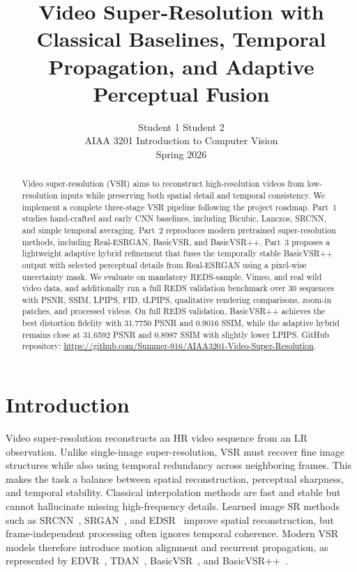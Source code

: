 \documentclass[10pt,twocolumn,letterpaper]{article}
\title{Video Super-Resolution with Classical Baselines, Temporal Propagation, and Adaptive Perceptual Fusion}
\author{
  Student 1 \quad Student 2\\
  AIAA 3201 Introduction to Computer Vision\\
  Spring 2026
}
\begin{document}
\maketitle

\begin{abstract}
Video super-resolution (VSR) aims to reconstruct high-resolution videos from low-resolution inputs while preserving both spatial detail and temporal consistency. We implement a complete three-stage VSR pipeline following the project roadmap. Part~1 studies hand-crafted and early CNN baselines, including Bicubic, Lanczos, SRCNN, and simple temporal averaging. Part~2 reproduces modern pretrained super-resolution methods, including Real-ESRGAN, BasicVSR, and BasicVSR++. Part~3 proposes a lightweight adaptive hybrid refinement that fuses the temporally stable BasicVSR++ output with selected perceptual details from Real-ESRGAN using a pixel-wise uncertainty mask. We evaluate on mandatory REDS-sample, Vimeo, and real wild video data, and additionally run a full REDS validation benchmark over 30 sequences with PSNR, SSIM, LPIPS, FID, tLPIPS, qualitative rendering comparisons, zoom-in patches, and processed videos. On full REDS validation, BasicVSR++ achieves the best distortion fidelity with 31.7750 PSNR and 0.9016 SSIM, while the adaptive hybrid remains close at 31.6592 PSNR and 0.8987 SSIM with slightly lower LPIPS. GitHub repository: \url{https://github.com/Summer-916/AIAA3201-Video-Super-Resolution}.
\end{abstract}

\section{Introduction}
Video super-resolution reconstructs an HR video sequence from an LR observation. Unlike single-image super-resolution, VSR must recover fine image structures while also using temporal redundancy across neighboring frames. This makes the task a balance between spatial reconstruction, perceptual sharpness, and temporal stability. Classical interpolation methods are fast and stable but cannot hallucinate missing high-frequency details. Learned image SR methods such as SRCNN~\cite{dong2015srcnn}, SRGAN~\cite{ledig2017srgan}, and EDSR~\cite{lim2017edsr} improve spatial reconstruction, but frame-independent processing often ignores temporal coherence. Modern VSR models therefore introduce motion alignment and recurrent propagation, as represented by EDVR~\cite{wang2019edvr}, TDAN~\cite{tian2020tdan}, BasicVSR~\cite{chan2021basicvsr}, and BasicVSR++~\cite{chan2022basicvsrpp}.
\end{document}
